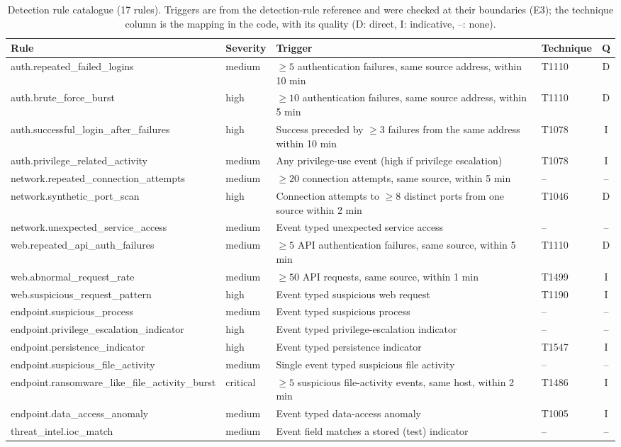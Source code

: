 \documentclass[conference]{IEEEtran}
\begin{document}
\begin{table}[t]
\caption{Detection rule catalogue (17 rules). Triggers are from the detection-rule reference and were checked at their boundaries (E3); the technique column is the mapping in the code, with its quality (D: direct, I: indicative, --: none).}
\label{tab:rules}
\centering
\footnotesize
\begin{tabular}{@{}l l l l c@{}}
\toprule
Rule & Severity & Trigger & Technique & Q \\
\midrule
auth.repeated\_failed\_logins & medium & $\geq 5$ authentication failures, same source address, within 10 min & T1110 & D \\
auth.brute\_force\_burst & high & $\geq 10$ authentication failures, same source address, within 5 min & T1110 & D \\
auth.successful\_login\_after\_failures & high & Success preceded by $\geq 3$ failures from the same address within 10 min & T1078 & I \\
auth.privilege\_related\_activity & medium & Any privilege-use event (high if privilege escalation) & T1078 & I \\
network.repeated\_connection\_attempts & medium & $\geq 20$ connection attempts, same source, within 5 min & -- & -- \\
network.synthetic\_port\_scan & high & Connection attempts to $\geq 8$ distinct ports from one source within 2 min & T1046 & D \\
network.unexpected\_service\_access & medium & Event typed unexpected service access & -- & -- \\
web.repeated\_api\_auth\_failures & medium & $\geq 5$ API authentication failures, same source, within 5 min & T1110 & D \\
web.abnormal\_request\_rate & medium & $\geq 50$ API requests, same source, within 1 min & T1499 & I \\
web.suspicious\_request\_pattern & high & Event typed suspicious web request & T1190 & I \\
endpoint.suspicious\_process & medium & Event typed suspicious process & -- & -- \\
endpoint.privilege\_escalation\_indicator & high & Event typed privilege-escalation indicator & -- & -- \\
endpoint.persistence\_indicator & high & Event typed persistence indicator & T1547 & I \\
endpoint.suspicious\_file\_activity & medium & Single event typed suspicious file activity & -- & -- \\
endpoint.ransomware\_like\_file\_activity\_burst & critical & $\geq 5$ suspicious file-activity events, same host, within 2 min & T1486 & I \\
endpoint.data\_access\_anomaly & medium & Event typed data-access anomaly & T1005 & I \\
threat\_intel.ioc\_match & medium & Event field matches a stored (test) indicator & -- & -- \\
\bottomrule
\end{tabular}
\end{table}
\end{document}
